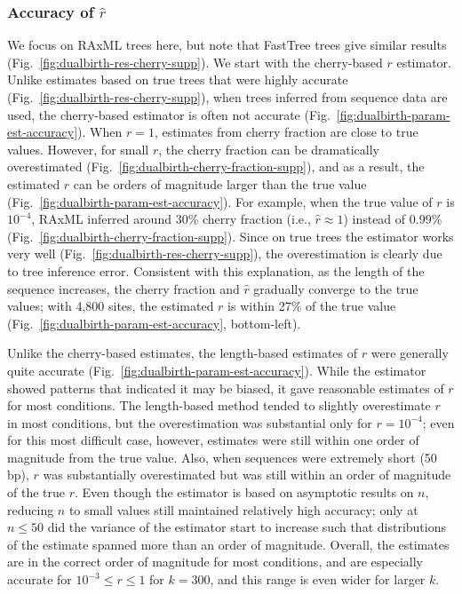 \subsubsection{Accuracy of $\hat{r}$}\label{accuracy-cherries}
We focus on RAxML trees here, but note that FastTree trees give similar results (Fig.~\ref{fig:dualbirth-res-cherry-supp}). We start with the cherry-based $r$ estimator. Unlike estimates based on true trees that were highly accurate (Fig.~\ref{fig:dualbirth-res-cherry-supp}), when trees inferred from sequence data are used, the cherry-based estimator is often not accurate (Fig.~\ref{fig:dualbirth-param-est-accuracy}). When $r=1$, estimates from cherry fraction are close to true values. However, for small $r$, the cherry fraction can be dramatically overestimated (Fig.~\ref{fig:dualbirth-cherry-fraction-supp}), and as a result, the estimated $r$ can be orders of magnitude larger than the true value (Fig.~\ref{fig:dualbirth-param-est-accuracy}). For example, when the true value of $r$ is $10^{-4}$, RAxML inferred around 30\% cherry fraction (i.e., $\hat{r}\approx 1$) instead of 0.99\% (Fig.~\ref{fig:dualbirth-cherry-fraction-supp}). Since on true trees the estimator works very well (Fig.~\ref{fig:dualbirth-res-cherry-supp}), the overestimation is clearly due to tree inference error. Consistent with this explanation, as the length of the sequence increases, the cherry fraction and $\hat{r}$ gradually converge to the true values; with 4,800 sites, the estimated $r$ is within 27\% of the true value (Fig.~\ref{fig:dualbirth-param-est-accuracy}, bottom-left).

Unlike the cherry-based estimates, the length-based estimates of $r$ were generally
quite accurate (Fig.~\ref{fig:dualbirth-param-est-accuracy}).
While the estimator showed patterns that indicated it may be biased, it gave reasonable estimates of $r$ for most conditions. The length-based method tended to slightly overestimate $r$ in most conditions, but the overestimation was substantial only for $r=10^{-4}$; even for this most difficult case, however, estimates were still  within one order of magnitude from the true value. Also, when sequences were extremely short (50 \gls{bp}), $r$ was substantially overestimated but was still within an order of magnitude of the true $r$. Even though the estimator is based on asymptotic results on $n$, reducing $n$ to small values still maintained relatively high accuracy; only at $n\leq 50$ did the variance of the estimator start to increase such that distributions of the estimate spanned more than an order of magnitude. Overall, the estimates are in the correct order of magnitude for most conditions, and are especially accurate for $10^{-3}\leq r\leq1$ for $k=300$, and this range is even wider for larger $k$.

